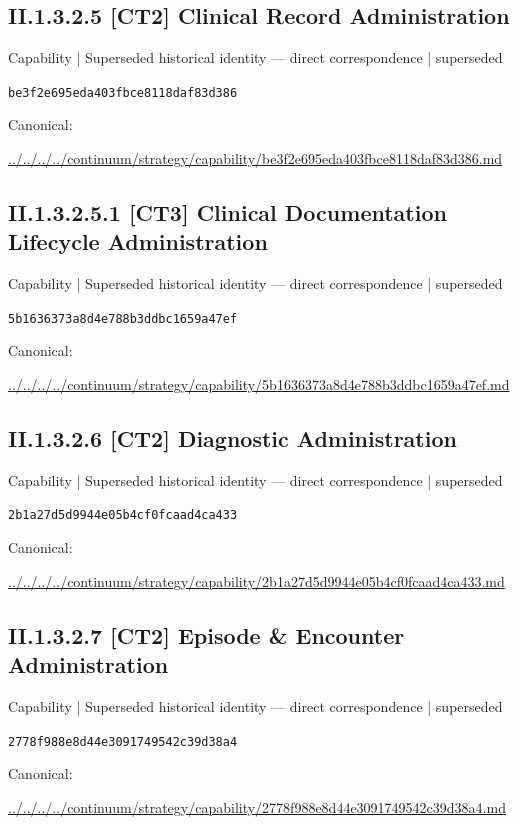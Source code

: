 \documentclass[10pt,a4paper]{article}
\begin{document}
\subsection*{II.1.3.2.5 [CT2] Clinical Record Administration}
{\small Capability | Superseded historical identity — direct correspondence | superseded}\par
\texttt{be3f2e695eda403fbce8118daf83d386}\par
Canonical: \par
{\footnotesize\url{../../../../continuum/strategy/capability/be3f2e695eda403fbce8118daf83d386.md}}\par
\subsection*{II.1.3.2.5.1 [CT3] Clinical Documentation Lifecycle Administration}
{\small Capability | Superseded historical identity — direct correspondence | superseded}\par
\texttt{5b1636373a8d4e788b3ddbc1659a47ef}\par
Canonical: \par
{\footnotesize\url{../../../../continuum/strategy/capability/5b1636373a8d4e788b3ddbc1659a47ef.md}}\par
\subsection*{II.1.3.2.6 [CT2] Diagnostic Administration}
{\small Capability | Superseded historical identity — direct correspondence | superseded}\par
\texttt{2b1a27d5d9944e05b4cf0fcaad4ca433}\par
Canonical: \par
{\footnotesize\url{../../../../continuum/strategy/capability/2b1a27d5d9944e05b4cf0fcaad4ca433.md}}\par
\subsection*{II.1.3.2.7 [CT2] Episode \& Encounter Administration}
{\small Capability | Superseded historical identity — direct correspondence | superseded}\par
\texttt{2778f988e8d44e3091749542c39d38a4}\par
Canonical: \par
{\footnotesize\url{../../../../continuum/strategy/capability/2778f988e8d44e3091749542c39d38a4.md}}\par
\end{document}
